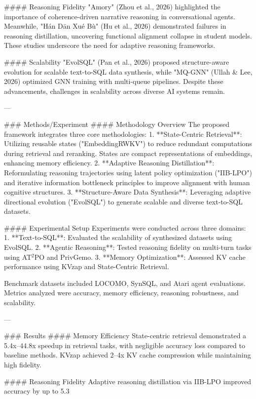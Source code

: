 #### Reasoning Fidelity  
"Amory" (Zhou et al., 2026) highlighted the importance of coherence-driven narrative reasoning in conversational agents. Meanwhile, "Hán Dān Xué Bù" (Hu et al., 2026) demonstrated failures in reasoning distillation, uncovering functional alignment collapse in student models. These studies underscore the need for adaptive reasoning frameworks.

#### Scalability  
"EvolSQL" (Pan et al., 2026) proposed structure-aware evolution for scalable text-to-SQL data synthesis, while "MQ-GNN" (Ullah & Lee, 2026) optimized GNN training with multi-queue pipelines. Despite these advancements, challenges in scalability across diverse AI systems remain.

---

### Methods/Experiment  
#### Methodology Overview  
The proposed framework integrates three core methodologies:
1. **State-Centric Retrieval**: Utilizing reusable states ("EmbeddingRWKV") to reduce redundant computations during retrieval and reranking. States are compact representations of embeddings, enhancing memory efficiency.
2. **Adaptive Reasoning Distillation**: Reformulating reasoning trajectories using latent policy optimization ("IIB-LPO") and iterative information bottleneck principles to improve alignment with human cognitive structures.
3. **Structure-Aware Data Synthesis**: Leveraging adaptive directional evolution ("EvolSQL") to generate scalable and diverse text-to-SQL datasets.

#### Experimental Setup  
Experiments were conducted across three domains:
1. **Text-to-SQL**: Evaluated the scalability of synthesized datasets using EvolSQL.
2. **Agentic Reasoning**: Tested reasoning fidelity on multi-turn tasks using AT$^2$PO and PrivGemo.
3. **Memory Optimization**: Assessed KV cache performance using KVzap and State-Centric Retrieval.

Benchmark datasets included LOCOMO, SynSQL, and Atari agent evaluations. Metrics analyzed were accuracy, memory efficiency, reasoning robustness, and scalability.

---

### Results  
#### Memory Efficiency  
State-centric retrieval demonstrated a 5.4x–44.8x speedup in retrieval tasks, with negligible accuracy loss compared to baseline methods. KVzap achieved 2–4x KV cache compression while maintaining high fidelity.

#### Reasoning Fidelity  
Adaptive reasoning distillation via IIB-LPO improved accuracy by up to 5.3%

